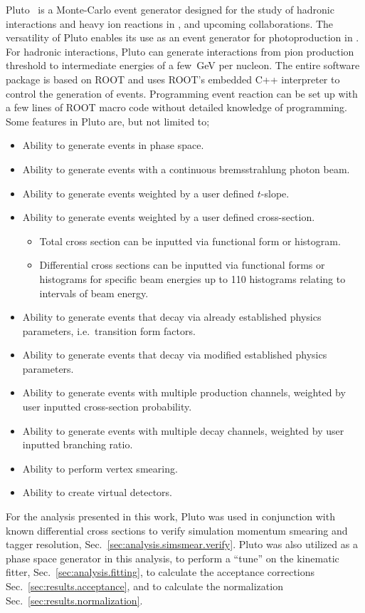 	Pluto~\cite{PLUTO} is a Monte-Carlo event generator designed for the study of hadronic interactions and heavy ion reactions in ,  and upcoming  collaborations. The versatility of Pluto enables its use as an event generator for photoproduction in . For hadronic interactions, Pluto can generate interactions from pion production threshold to intermediate energies of a few~GeV per nucleon. The entire software package is based on ROOT and uses ROOT's embedded C++ interpreter to control the generation of events. Programming event reaction can be set up with a few lines of ROOT macro code without detailed knowledge of programming. Some features in Pluto are, but not limited to;
	\begin{itemize}
		\item Ability to generate events in phase space.
		\item Ability to generate events with a continuous bremsstrahlung photon beam.
		\item Ability to generate events weighted by a user defined $t$-slope.
		\item Ability to generate events weighted by a user defined cross-section.
		\begin{itemize}
			\item Total cross section can be inputted via functional form or histogram.
			\item Differential cross sections can be inputted via functional forms or histograms for specific beam energies up to 110 histograms relating to intervals of beam energy.
		\end{itemize}
		\item Ability to generate events that decay via already established physics parameters, i.e.~transition form factors.
		\item Ability to generate events that decay via modified established physics parameters.
		\item Ability to generate events with multiple production channels, weighted by user inputted cross-section probability.
		\item Ability to generate events with multiple decay channels, weighted by user inputted branching ratio.
		\item Ability to perform vertex smearing.
		\item Ability to create virtual detectors.
	\end{itemize}
	
	For the analysis presented in this work, Pluto was used in conjunction with known differential cross sections to verify simulation momentum smearing and tagger resolution, Sec.~\ref{sec:analysis.simsmear.verify}. Pluto was also utilized as a phase space generator in this analysis, to perform a ``tune'' on the kinematic fitter, Sec.~\ref{sec:analysis.fitting}, to calculate the acceptance corrections Sec.~\ref{sec:results.acceptance}, and to calculate the normalization Sec.~\ref{sec:results.normalization}.